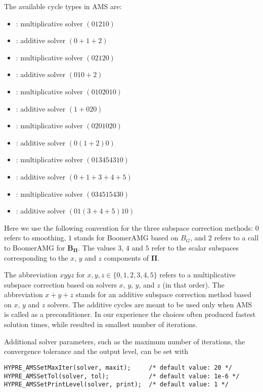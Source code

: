 \noindent
The available cycle types in AMS are:
\begin{itemize}
\item {}: multiplicative solver $(01210)$
\item {}: additive solver $(0+1+2)$
\item {}: multiplicative solver $(02120)$
\item {}: additive solver $(010+2)$
\item {}: multiplicative solver $(0102010)$
\item {}: additive solver $(1+020)$
\item {}: multiplicative solver $(0201020)$
\item {}: additive solver $(0(1+2)0)$
\item {}: multiplicative solver $(013454310)$
\item {}: additive solver $(0+1+3+4+5)$
\item {}: multiplicative solver $(034515430)$
\item {}: additive solver $(01(3+4+5)10)$
\end{itemize}
Here we use the following convention for the
three subspace correction methods:
$0$ refers to smoothing, $1$ stands for BoomerAMG based on $B_G$, and
$2$ refers to a call to BoomerAMG for ${\mathbf B}_{{\mathbf \Pi}}$.
The values $3$, $4$ and $5$ refer to the scalar subspaces
corresponding to the $x$, $y$ and $z$ components of $\mathbf \Pi$.

The abbreviation $xyyz$  for $x,y,z \in \{0,1,2,3,4,5\}$
refers to a multiplicative subspace correction based on solvers $x$, $y$, $y$, and $z$ (in that order).
The abbreviation $x+y+z$ stands for an additive subspace correction method
based on $x$, $y$ and $z$ solvers.
The additive cycles are meant to be used only when AMS is called
as a preconditioner.
In our experience the choices  often produced
fastest solution times, while  resulted in smallest
number of iterations.

Additional solver parameters, such as the maximum number of iterations,
the convergence tolerance and the output level, can be set with
\begin{display}\begin{verbatim}
HYPRE_AMSSetMaxIter(solver, maxit);     /* default value: 20 */
HYPRE_AMSSetTol(solver, tol);           /* default value: 1e-6 */
HYPRE_AMSSetPrintLevel(solver, print);  /* default value: 1 */
\end{verbatim}\end{display}

